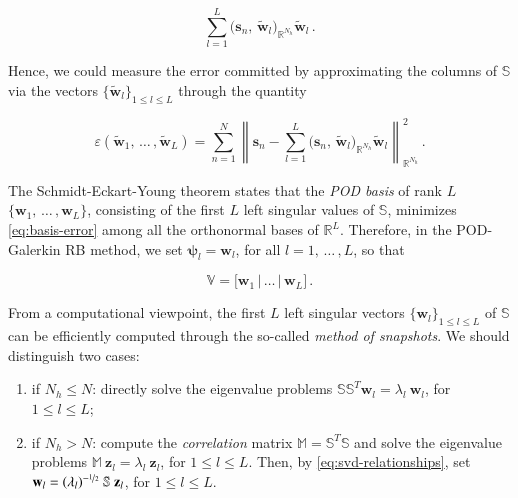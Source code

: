 \documentclass[longtitle]{elsarticle}
\numberwithin{equation}{section}
\theoremstyle{theorem}
\theoremstyle{definition}
\theoremstyle{remark}
\theoremstyle{proposition}
\numberwithin{figure}{section}
\newcommand{\norm}[1]{\left\lVert#1\right\rVert}
\newcommand{\wt}[1]{\widetilde{#1}}
\newcommand{\bg}[1]{\boldsymbol{#1}}
\begin{document}
		\begin{linenomath}\begin{equation*}
			\sum_{l = 1}^L \big( \mathbf{s}_n, \, \wt{\mathbf{w}}_l \big)_{\mathbb{R}^{N_h}} \wt{\mathbf{w}}_l \, .
		\end{equation*}\end{linenomath} 
		Hence, we could measure the error committed by approximating the columns of $\mathbb{S}$ via the vectors $\big\lbrace \wt{\mathbf{w}}_l \big\rbrace_{1 \leq l \leq L}$ through the quantity
		\begin{linenomath}\begin{linenomath}\begin{equation}
			\label{eq:basis-error}
			\varepsilon(\wt{\mathbf{w}}_1, \, \ldots \, , \wt{\mathbf{w}}_L) = \sum_{n = 1}^N \norm{\mathbf{s}_n - \sum_{l = 1}^L \big( \mathbf{s}_n, \, \wt{\mathbf{w}}_l \big)_{\mathbb{R}^{N_h}} \wt{\mathbf{w}}_l}_{\mathbb{R}^{N_h}}^2 \, .
		\end{equation}\end{linenomath}\end{linenomath}
		The Schmidt-Eckart-Young theorem \cite{EY36, Sch07} states that the \emph{POD basis} of rank $L$ $\big\lbrace \mathbf{w}_1, \, \ldots \, , \mathbf{w}_L \big\rbrace$, consisting of the first $L$ left singular values of $\mathbb{S}$, minimizes \eqref{eq:basis-error} among all the orthonormal bases of $\mathbb{R}^L$. Therefore, in the POD-Galerkin RB method, we set $\bg{\psi}_l = \mathbf{w}_l$, for all $l = 1, \, \ldots \, , L$, so that
		\begin{linenomath}\begin{equation*}
			\mathbb{V} = \big[ \mathbf{w}_1 \, \big| \, \ldots \, \big| \, \mathbf{w}_L \big] \, . 		
		\end{equation*}\end{linenomath}
		From a computational viewpoint, the first $L$ left singular vectors $\big\lbrace \mathbf{w}_l \big\rbrace_{1 \leq l \leq L}$ of $\mathbb{S}$ can be efficiently computed through the so-called \emph{method of snapshots}. We should distinguish two cases:
		\begin{enumerate}[label=(\alph*)]
			\item if ${N_h} \leq N$: directly solve the eigenvalue problems $\mathbb{S} \mathbb{S}^T \mathbf{w}_l = \lambda_l ~ \mathbf{w}_l$, for $1 \leq l \leq L$;
			\item if ${N_h} > N$: compute the \emph{correlation} matrix $\mathbb{M} = \mathbb{S}^T \mathbb{S}$ and solve the eigenvalue problems $\mathbb{M} ~ \mathbf{z}_l = \lambda_l ~ \mathbf{z}_l$, for $1 \leq l \leq L$. Then, by \eqref{eq:svd-relationships}, set $\mathbf{w}_l = (\lambda_l)^{-\nicefrac{1}{2}} ~ \mathbb{S} ~ \mathbf{z}_l$, for $1 \leq l \leq L$.
		\end{enumerate}
		
\end{document}
